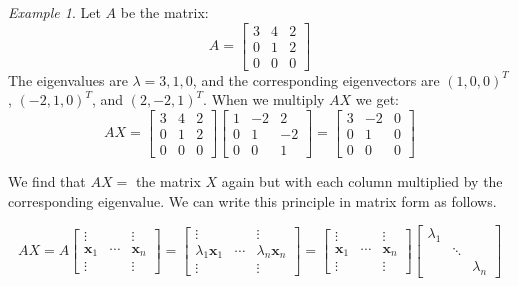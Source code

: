 \documentclass[11pt,oneside]{amsbook}
\theoremstyle{definition}
\theoremstyle{plain}
\theoremstyle{definition}
\theoremstyle{remark}
\newtheorem{example}[theorem]{Example}
\numberwithin{equation}{section}
\numberwithin{figure}{section}
\begin{document}
\begin{example}
  Let $A$ be the matrix:
  \[A=\begin{bmatrix}
      3 & 4 & 2 \\
      0 & 1 & 2 \\
      0 & 0 & 0
      \end{bmatrix}
  \]
  The eigenvalues are $\lambda=3,1,0$, and the corresponding eigenvectors are $(1,0,0)^T$, $(-2,1,0)^T$, and $(2,-2,1)^T$. When we multiply $AX$ we get:
  \[AX=\begin{bmatrix}
      3 & 4 & 2 \\
      0 & 1 & 2 \\
      0 & 0 & 0
    \end{bmatrix}
    \begin{bmatrix}
      1 & -2 & 2 \\
      0 & 1 & -2 \\
      0 & 0 & 1
    \end{bmatrix}
    =
    \begin{bmatrix}
      3 & -2 & 0 \\
      0 & 1 & 0 \\
      0 & 0 & 0
    \end{bmatrix}      
  \]
\end{example}

We find that $AX=$ the matrix $X$ again but with each column multiplied by the corresponding eigenvalue. We can write this principle in matrix form as follows.

\[AX=A\begin{bmatrix}
    \vdots&&\vdots\\
    \bm{x}_1&\cdots&\bm{x}_n\\
    \vdots&&\vdots
  \end{bmatrix}
  =\begin{bmatrix}
    \vdots&&\vdots\\
    \lambda_1\bm{x}_1&\cdots&\lambda_n\bm{x}_n\\
    \vdots&&\vdots
  \end{bmatrix}
  =\begin{bmatrix}
    \vdots&&\vdots\\
    \bm{x}_1&\cdots&\bm{x}_n\\
    \vdots&&\vdots
  \end{bmatrix}
  \begin{bmatrix}
    \lambda_1\\&\ddots&\\&&\lambda_n
  \end{bmatrix}
\]
\end{document}

